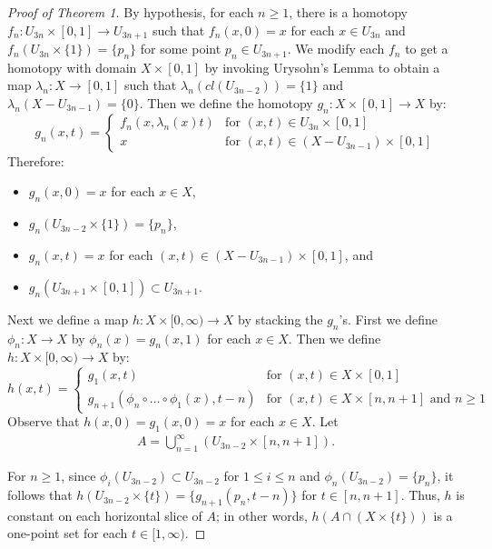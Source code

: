 \documentclass[12pt]{amsart}%
\theoremstyle{plain}
\numberwithin{equation}{section}
\begin{document}
\begin{proof}[Proof of Theorem 1]
By hypothesis, for each $n \geq 1$, there is a homotopy $f_n : U_{3n} \times [0,1] \rightarrow U_{3n+1}$ such that $f_n(x,0) = x$ for each $x \in U_{3n}$ and $f_n(U_{3n} \times \{1\}) = \{p_n\}$ for some point $p_n \in U_{3n+1}$. We modify each $f_n$ to get a homotopy with domain $X \times [0,1]$ by invoking Urysohn's Lemma to obtain a map $\lambda_n : X \rightarrow [0,1]$ such that $\lambda_n(cl(U_{3n-2})) = \{1\}$ and $\lambda_n(X - U_{3n-1}) = \{0\}$.  
Then we define the homotopy $g_n : X \times [0,1] \rightarrow X$ by:
\[ 
	g_n(x,t) =
	\begin{cases}
		f_n(x,\lambda_n(x)t)             &\text{for $(x,t) \in U_{3n} \times [0,1]$}\\
		x				           &\text{for $(x,t) \in (X - U_{3n-1}) \times [0,1]$}
	\end{cases}
\]
\noindent Therefore:
\begin{itemize}
\item $g_n(x,0) = x$ for each $x \in X$,
\item $g_n(U_{3n-2} \times \{1\}) = \{p_n\}$,
\item $g_n(x,t) = x$ for each $(x,t) \in (X - U_{3n-1}) \times [0,1]$, and
\item $g_n(U_{3n+1} \times [0,1]) \subset U_{3n+1}$.
\end{itemize}

\indent Next we define a map $h : X \times [0,\infty) \rightarrow X$ by stacking the $g_n$'s.  First we define $\phi_n : X \rightarrow X$ by $\phi_n(x) = g_n(x,1)$ for each $x \in X$.  Then we define $h : X \times [0,\infty) \rightarrow X$ by:
\[
	h(x,t) =
	\begin{cases}
		g_1(x,t) 		&\text{for $(x,t) \in X \times [0,1]$}\\
		g_{n+1}(\phi_n\circ\dots\circ\phi_1(x),t - n)  &\text{for $(x,t) \in X \times [n,n+1]$ and $n \geq 1$}
	\end{cases}
\]
\indent Observe that $h(x,0) = g_1(x,0) = x$ for each $x \in X$.  Let 
\begin{align*}
A  = \bigcup_{n=1}^{\infty}(U_{3n-2} \times [n,n+1]).
\end{align*}

For $n \geq 1$, since $\phi_i(U_{3n-2}) \subset U_{3n-2}$ for $1 \leq i \leq n$ and $\phi_n(U_{3n-2}) = \{p_n\}$, it follows that $h(U_{3n-2} \times \{t\}) = \{g_{n+1}(p_n,t - n)\}$ for $t \in [n,n+1]$.  Thus, $h$ is constant on each horizontal slice of $A$; in other words, $h(A \cap (X \times \{t\}))$ is a one-point set for each $t \in [1,\infty)$.  


\end{proof}
\end{document}
